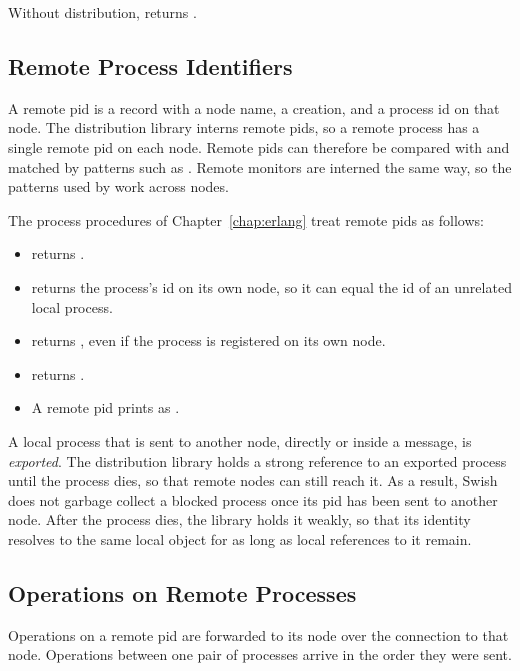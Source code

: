 Without distribution,  returns
.

\subsection {Remote Process Identifiers}

A remote pid is a record with a node name, a creation, and a process id
on that node. The distribution library interns remote pids, so a remote
process has a single remote pid on each node. Remote pids can therefore
be compared with  and matched by  patterns such as
. Remote monitors are interned the same way, so the
 patterns used by  work across nodes.

The process procedures of Chapter~\ref{chap:erlang} treat remote pids as
follows:\antipar

\begin{itemize}
\item {} returns .
\item {} returns the process's id on its own node, so it
  can equal the id of an unrelated local process.
\item {} returns , even if the process is
  registered on its own node.
\item {} returns
  .
\item A remote pid prints as .
\end{itemize}

A local process that is sent to another node, directly or inside a
message, is \emph{exported}. The distribution
library holds a strong reference to an exported process until the
process dies, so that remote nodes can still reach it. As a result,
Swish does not garbage collect a blocked process once its pid has been
sent to another node. After the process dies, the library holds it
weakly, so that its identity resolves to the same local object for as
long as local references to it remain.

\subsection {Operations on Remote Processes}

Operations on a remote pid are forwarded to its node over the
connection to that node. Operations between one pair of processes
arrive in the order they were sent.\antipar

